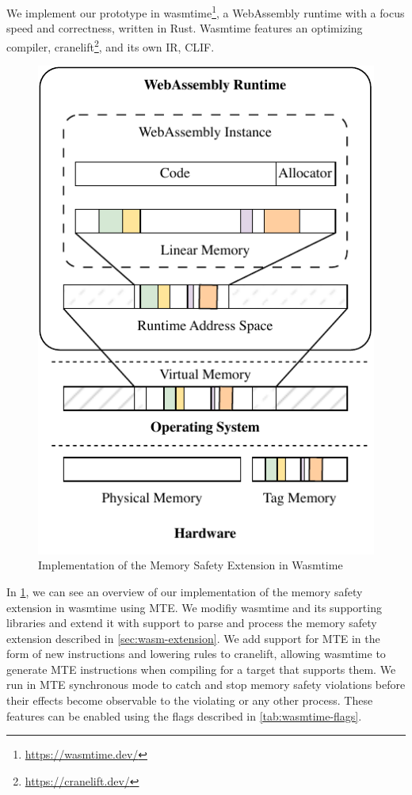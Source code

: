 We implement our prototype in wasmtime\footnote{\url{https://wasmtime.dev/}}, a WebAssembly runtime with a focus speed and correctness, written in Rust.
Wasmtime features an optimizing compiler, cranelift\footnote{\url{https://cranelift.dev/}}, and its own \ac{IR}, \ac{CLIF}.

\begin{figure}[t]
  \centering
  \includegraphics[scale=1]{figures/build/system-design-2}
  \caption{Implementation of the Memory Safety Extension in Wasmtime}
  \label{fig:wasmtime-mte-impl}
\end{figure}

In \cref{fig:wasmtime-mte-impl}, we can see an overview of our implementation of the memory safety extension in wasmtime using \ac{MTE}.
We modifiy wasmtime and its supporting libraries and extend it with support to parse and process the memory safety extension described in \cref{sec:wasm-extension}.
We add support for \ac{MTE} in the form of new instructions and lowering rules to cranelift, allowing wasmtime to generate \ac{MTE} instructions when compiling for a target that supports them.
We run in \ac{MTE} synchronous mode to catch and stop memory safety violations before their effects become observable to the violating or any other process.
These features can be enabled using the flags described in \cref{tab:wasmtime-flags}.

